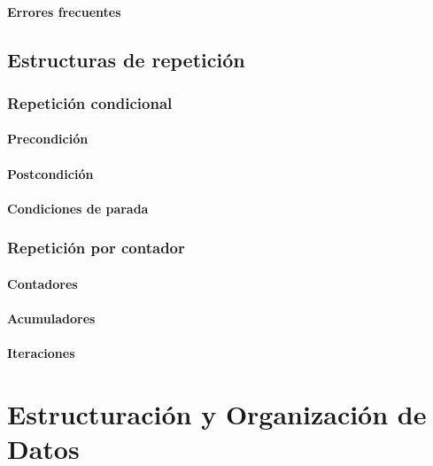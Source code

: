 \documentclass[12pt,twoside]{book}
\begin{document}
	\subsubsection{Errores frecuentes}
	
	\section{Estructuras de repetición}
	
	\subsection{Repetición condicional}
	
	\subsubsection{Precondición}
	
	\subsubsection{Postcondición}
	
	\subsubsection{Condiciones de parada}
	
	\subsection{Repetición por contador}
	
	\subsubsection{Contadores}
	
	\subsubsection{Acumuladores}
	
	\subsubsection{Iteraciones}
	
	\chapter{Estructuración y Organización de Datos}
	
\end{document}
